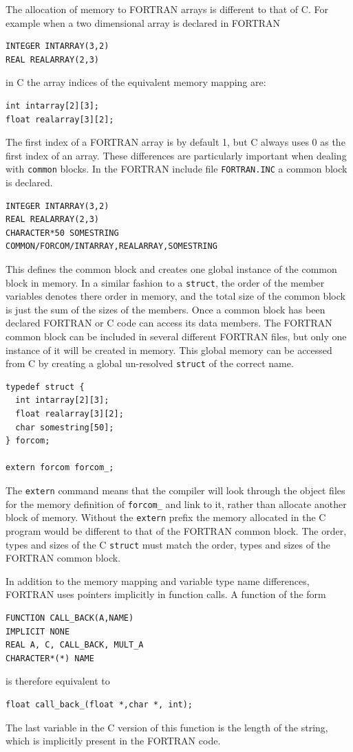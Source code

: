 \documentclass[11pt]{scrartcl}
\begin{document}
The allocation of memory to FORTRAN arrays is different to that of C.
For example when a two dimensional array is declared in FORTRAN
\lstset{language=Fortran}
\begin{lstlisting}
INTEGER INTARRAY(3,2)
REAL REALARRAY(2,3)
\end{lstlisting}
\lstset{language=C}
in C the array indices of the equivalent memory mapping are:
\begin{lstlisting}
int intarray[2][3];
float realarray[3][2];
\end{lstlisting}
The first index of a FORTRAN array is by default 1, but C always uses
0 as the first index of an array.  These differences are particularly
important when dealing with \texttt{common} blocks.  In the FORTRAN
include file \texttt{FORTRAN.INC} a common block is declared.
\lstset{language=Fortran}
\begin{lstlisting}
INTEGER INTARRAY(3,2)
REAL REALARRAY(2,3)
CHARACTER*50 SOMESTRING
COMMON/FORCOM/INTARRAY,REALARRAY,SOMESTRING
\end{lstlisting}
\lstset{language=C}
This defines the common block and creates one global instance of the
common block in memory.  In a similar fashion to a \texttt{struct}, the
order of the member variables denotes there order in memory, and the total
size of the common block is just the sum of the sizes of the members.
Once a common block has been declared FORTRAN or C code can access its
data members.  The FORTRAN common block can be included in several
different FORTRAN files, but only one instance of it will be created
in memory.  This global memory can be accessed from C by creating a
global un-resolved \texttt{struct} of the correct name.
\begin{lstlisting}
typedef struct {
  int intarray[2][3];
  float realarray[3][2];
  char somestring[50];
} forcom;

extern forcom forcom_;
\end{lstlisting}
The \texttt{extern} command means that the compiler will look through
the object files for the memory definition of \texttt{forcom\_} and
link to it, rather than allocate another block of memory.  Without the
\texttt{extern} prefix the memory allocated in the C program would be
different to that of the FORTRAN common block.  The order, types and
sizes of the C \texttt{struct} must match the order, types and sizes of the
FORTRAN common block.

In addition to the memory mapping and variable type name differences,
FORTRAN uses pointers implicitly in function calls.  A function
of the form
\lstset{language=Fortran}
\begin{lstlisting}
FUNCTION CALL_BACK(A,NAME)
IMPLICIT NONE
REAL A, C, CALL_BACK, MULT_A
CHARACTER*(*) NAME
\end{lstlisting}
\lstset{language=C}
is therefore equivalent to
\begin{lstlisting}
float call_back_(float *,char *, int);
\end{lstlisting}
The last variable in the C version of this function is the length of
the string, which is implicitly present in the FORTRAN code.  
\end{document}
